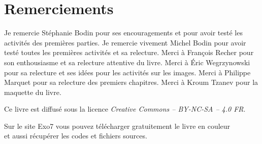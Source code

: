 
\clearemptydoublepage
\pagestyle{empty}\thispagestyle{empty}

\vspace*{\fill}

\section*{Remerciements}


Je remercie Stéphanie Bodin pour ses encouragements et pour avoir testé les activités des premières parties.
Je remercie vivement Michel Bodin pour avoir testé toutes les premières activités et sa relecture.
Merci à François Recher pour son enthousiasme et sa relecture attentive du livre. 
Merci à Éric Wegrzynowski pour sa relecture et ses idées pour les activités sur les images. 
Merci à Philippe Marquet pour sa relecture des premiers chapitres. Merci à Kroum Tzanev pour la maquette du livre.




\vspace*{\fill}

\bigskip 

\begin{center}
\end{center}



\begin{center}
Ce livre est diffusé sous la licence \emph{Creative Commons -- BY-NC-SA -- 4.0 FR}.


Sur le site Exo7 vous pouvez télécharger gratuitement le livre en couleur\\
et aussi récupérer les codes et fichiers sources.

\end{center}




\printindex
{}

